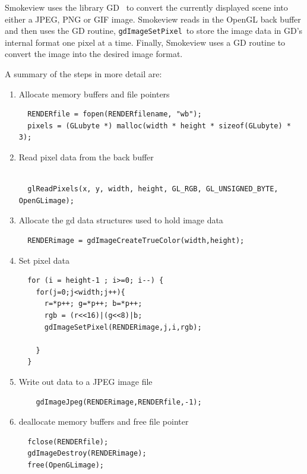 \documentclass[11pt,twoside]{book}
\begin{document}
Smokeview uses the library GD~\cite{GDLIB} to convert the
currently displayed scene into either a JPEG, PNG or GIF image.
Smokeview reads in the OpenGL back buffer and then uses the GD
routine, {\tt gdImageSetPixel}\ to store the image data in GD's
internal format one pixel at a time.    Finally, Smokeview uses a
GD routine to convert the image into the desired image format.

A summary of the steps in more detail are:
\begin{enumerate}
\item Allocate memory buffers and file pointers
\begin{verbatim}
  RENDERfile = fopen(RENDERfilename, "wb");
  pixels = (GLubyte *) malloc(width * height * sizeof(GLubyte) * 3);
\end{verbatim}

\item Read pixel data from the back buffer
\begin{verbatim}

  glReadPixels(x, y, width, height, GL_RGB, GL_UNSIGNED_BYTE, OpenGLimage);
\end{verbatim}
\item Allocate the gd data structures used to hold image data
\begin{verbatim}
  RENDERimage = gdImageCreateTrueColor(width,height);
\end{verbatim}

\item Set pixel data

\begin{verbatim}
  for (i = height-1 ; i>=0; i--) {
    for(j=0;j<width;j++){
      r=*p++; g=*p++; b=*p++;
      rgb = (r<<16)|(g<<8)|b;
      gdImageSetPixel(RENDERimage,j,i,rgb);

    }
  }
\end{verbatim}

\item Write out data to a JPEG image file

\begin{verbatim}
    gdImageJpeg(RENDERimage,RENDERfile,-1);
\end{verbatim}

\item deallocate memory buffers and free file pointer

\begin{verbatim}
  fclose(RENDERfile);
  gdImageDestroy(RENDERimage);
  free(OpenGLimage);
\end{verbatim}

\end{enumerate}
\end{document}
